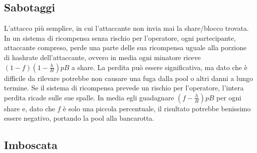 \subsection{Sabotaggi}

L'attacco più semplice, in cui l'attaccante non invia mai la share/blocco trovata.
In un sistema di ricompensa senza rischio per l'operatore, ogni partecipante, attaccante compreso, perde una parte delle sua ricompensa uguale alla porzione di hashrate dell'attaccante, ovvero in media ogni minatore riceve $(1-f)\left(1-\frac{h}{H}\right)pB$ a share. La perdita può essere significativa, ma dato che è difficile da rilevare potrebbe non causare una fuga dalla pool o altri danni a lungo termine.
Se il sistema di ricompensa prevede un rischio per l'operatore, l'intera perdita ricade sulle sue spalle. In media egli guadagnare $\left(f-\frac{h}{H}\right)pB$ per ogni share e, dato che $f$ è solo una piccola percentuale, il risultato potrebbe benissimo essere negativo, portando la pool alla bancarotta.

\subsection{Imboscata}

